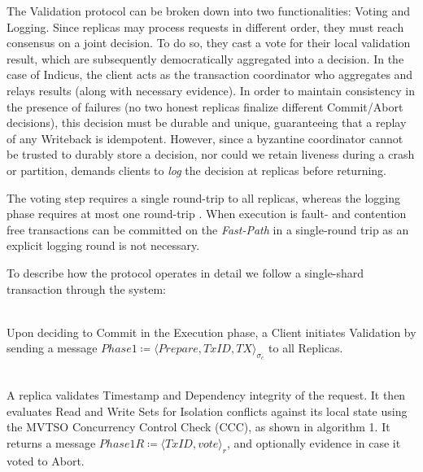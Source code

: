 The Validation protocol can be broken down into two functionalities: Voting and Logging.
Since \sys replicas may process requests in different order, they must reach consensus on a joint  decision. To do so, they cast a vote for their local validation result, which are subsequently democratically aggregated into a decision. In the case of Indicus, the client acts as the transaction coordinator who aggregates and relays results (along with necessary evidence).
In order to maintain consistency in the presence of failures (no two honest replicas finalize different Commit/Abort decisions), this decision must be durable and unique, guaranteeing that a replay of any Writeback is idempotent. However, since a byzantine coordinator cannot be trusted to durably store a decision, nor could we retain liveness during a crash or partition, \sys demands clients to \textit{log} the decision at replicas before returning.
 

The voting step requires a single round-trip to all replicas, whereas the logging phase requires at most one round-trip . When execution is fault- and contention free transactions can be committed on the \textit{Fast-Path} in a single-round trip as an explicit logging round is not necessary.


To describe how the protocol operates in detail we follow a single-shard transaction through the system:

\\
Upon deciding to Commit in the Execution phase, a Client initiates Validation by sending a message $Phase1 \coloneqq \langle Prepare, TxID, TX \rangle_{\sigma_c}$ to all Replicas.

\\
A replica validates Timestamp and Dependency integrity of the request. It then evaluates Read and Write Sets for Isolation conflicts against its local state using the MVTSO Concurrency Control Check (CCC), as shown in algorithm 1. It returns a message $Phase1R \coloneqq \langle TxID, vote \rangle_r$, and optionally evidence in case it voted to Abort.

